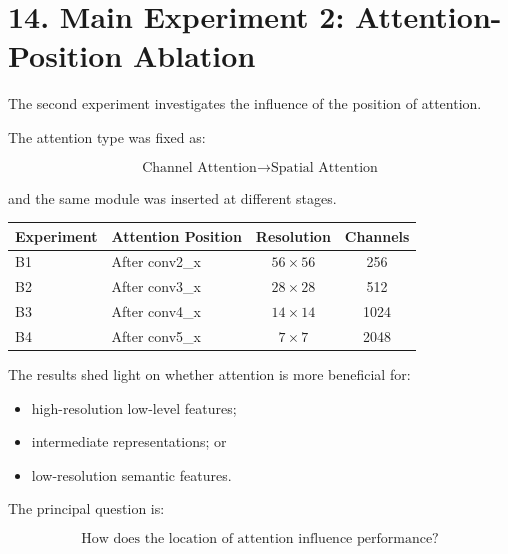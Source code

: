 \documentclass[10pt]{article}
\begin{document}
\section*{14. Main Experiment 2: Attention-Position Ablation}

The second experiment investigates the influence of the position of
attention.

The attention type was fixed as:

\[
\boxed{
\text{Channel Attention}
\rightarrow
\text{Spatial Attention}
}
\]

and the same module was inserted at different stages.

\begin{center}

\begin{tabular}{|l|l|c|c|}
\hline

\textbf{Experiment}
&
\textbf{Attention Position}
&
\textbf{Resolution}
&
\textbf{Channels}
\\
\hline

B1
&
After conv2\_x
&
$56\times56$
&
256
\\
\hline

B2
&
After conv3\_x
&
$28\times28$
&
512
\\
\hline

B3
&
After conv4\_x
&
$14\times14$
&
1024
\\
\hline

B4
&
After conv5\_x
&
$7\times7$
&
2048
\\
\hline

\end{tabular}

\end{center}

The results shed light on whether attention is more beneficial for:

\begin{itemize}

\item high-resolution low-level features;

\item intermediate representations; or

\item low-resolution semantic features.

\end{itemize}

The principal question is:

\[
\boxed{
\text{How does the location of attention influence performance?}
}
\]
\end{document}
